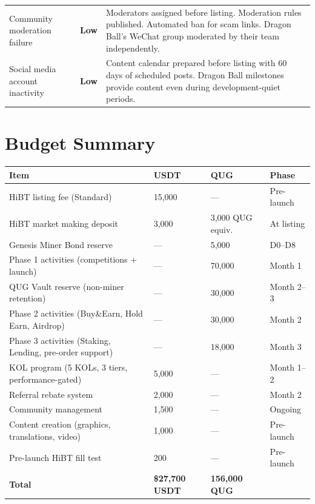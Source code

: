 \documentclass[11pt,a4paper]{article}
\begin{document}
\begin{center}
\begin{tabular}{L{4cm} C{1.5cm} L{8cm}}
  Community moderation failure & \textcolor{quggreen}{\textbf{Low}} & Moderators assigned before listing. Moderation rules published. Automated ban for scam links. Dragon Ball's WeChat group moderated by their team independently. \\

  Social media account inactivity & \textcolor{quggreen}{\textbf{Low}} & Content calendar prepared before listing with 60 days of scheduled posts. Dragon Ball milestones provide content even during development-quiet periods. \\

  \bottomrule
\end{tabular}
\end{center}

\section{Budget Summary}

\begin{center}
\begin{tabular}{L{5.5cm} R{2.5cm} R{2.5cm} L{2cm}}
  \toprule
  \textbf{Item} & \textbf{USDT} & \textbf{QUG} & \textbf{Phase} \\
  \midrule
  HiBT listing fee (Standard) & 15,000 & --- & Pre-launch \\
  HiBT market making deposit & 3,000 & 3,000 QUG equiv. & At listing \\
  Genesis Miner Bond reserve & --- & 5,000 & D0--D8 \\
  Phase 1 activities (competitions + launch) & --- & 70,000 & Month 1 \\
  QUG Vault reserve (non-miner retention) & --- & 30,000 & Month 2--3 \\
  Phase 2 activities (Buy\&Earn, Hold Earn, Airdrop) & --- & 30,000 & Month 2 \\
  Phase 3 activities (Staking, Lending, pre-order support) & --- & 18,000 & Month 3 \\
  KOL program (5 KOLs, 3 tiers, performance-gated) & 5,000 & --- & Month 1--2 \\
  Referral rebate system & 2,000 & --- & Month 2 \\
  Community management & 1,500 & --- & Ongoing \\
  Content creation (graphics, translations, video) & 1,000 & --- & Pre-launch \\
  Pre-launch HiBT fill test & 200 & --- & Pre-launch \\
  \midrule
  \textbf{Total} & \textbf{\$27,700 USDT} & \textbf{156,000 QUG} & \\
  \bottomrule
\end{tabular}
\end{center}
\end{document}
